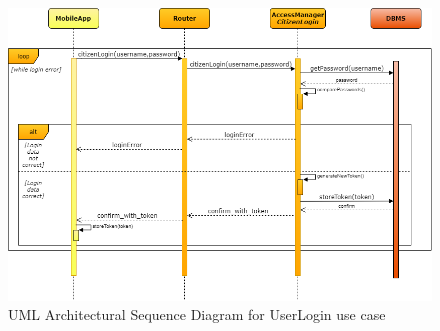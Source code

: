 \documentclass[a4paper]{report}
\begin{document}
\begin{landscape}

\begin{figure}[hp]
\includegraphics[angle=0, scale=0.70]{ArchSequenceUserLogin}
\caption{UML Architectural Sequence Diagram for UserLogin use case}
\label{fig:seq-userLogin}
\end{figure}

\end{landscape}
\end{document}
